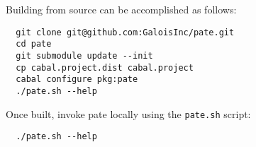 Building from source can be accomplished as follows:
\begin{verbatim}
  git clone git@github.com:GaloisInc/pate.git
  cd pate
  git submodule update --init
  cp cabal.project.dist cabal.project
  cabal configure pkg:pate
  ./pate.sh --help
\end{verbatim}

Once built, invoke pate locally using the \texttt{pate.sh} script:

\begin{verbatim}
  ./pate.sh --help
\end{verbatim}

